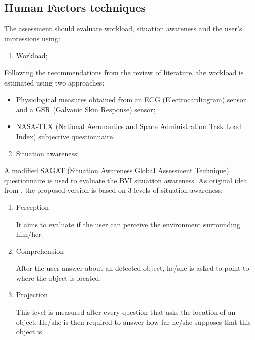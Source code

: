     \subsection*{Human Factors techniques}
    The assessment should evaluate workload, situation awareness and the user's impressions using:

%    

    \begin{enumerate} [label = \Alph*)]
        \setcounter{enumi}{0}
        \item Workload;
    \end{enumerate}

    Following the recommendations from the review of literature, the workload is estimated using two approaches:
    \begin{itemize}
        \item Physiological measures obtained from an ECG (Electrocardiogram) sensor and a GSR (Galvanic Skin Response) sensor;
        \item NASA-TLX (National Aeronautics and Space Administration Task Load Index) subjective questionnaire.
    \end{itemize}

    \begin{enumerate} [label = \Alph*)]
        \setcounter{enumi}{1}
        \item Situation awareness;
    \end{enumerate}

    A modified SAGAT (Situation Awareness Global Assessment Technique) questionnaire is used to evaluate the BVI situation awareness.
    As original idea from \cite{endsley1988design}, the proposed version is based on 3 levels of situation awareness:
    
    \begin{enumerate}[leftmargin = 6em, label = Level \arabic* -- ]
        \item Perception
        
        It aims to evaluate if the user can perceive the environment surrounding him/her.

        \item Comprehension

        After the user answer about an detected object, he/she is asked to point to where the object is located. 

        \item Projection
        
        This level is measured after every question that asks the location of an object. He/she is then required to answer how far he/she supposes that this object is
        
    \end{enumerate}      

